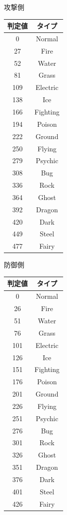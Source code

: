\documentclass[a4paper,titlepage,11pt]{ltjsarticle}
\begin{document}
攻撃側
\begin{tabular}{|c|c|}\hline
  判定値 & タイプ\\ \hline
  0 & Normal \\ \hline
  27 & Fire \\ \hline
  52 & Water \\ \hline
  81 & Grass \\ \hline
  109 & Electric \\ \hline
  138 & Ice \\ \hline
  166 & Fighting \\ \hline
  194 & Poison \\ \hline
  222 & Ground \\ \hline
  250 & Flying \\ \hline
  279 & Psychic \\ \hline
  308 & Bug \\ \hline
  336 & Rock \\ \hline
  364 & Ghost \\ \hline
  392 & Dragon \\ \hline
  420 & Dark \\ \hline
  449 & Steel \\ \hline
  477 & Fairy \\ \hline
\end{tabular}

防御側
\begin{tabular}{|c|c|}\hline
  判定値 & タイプ\\ \hline
  0 & Normal \\ \hline
  26 & Fire \\ \hline
  51 & Water \\ \hline
  76 & Grass \\ \hline
  101 & Electric \\ \hline
  126 & Ice \\ \hline
  151 & Fighting \\ \hline
  176 & Poison \\ \hline
  201 & Ground \\ \hline
  226 & Flying \\ \hline
  251 & Psychic \\ \hline
  276 & Bug \\ \hline
  301 & Rock \\ \hline
  326 & Ghost \\ \hline
  351 & Dragon \\ \hline
  376 & Dark \\ \hline
  401 & Steel \\ \hline
  426 & Fairy \\ \hline
\end{tabular}
\end{document}
